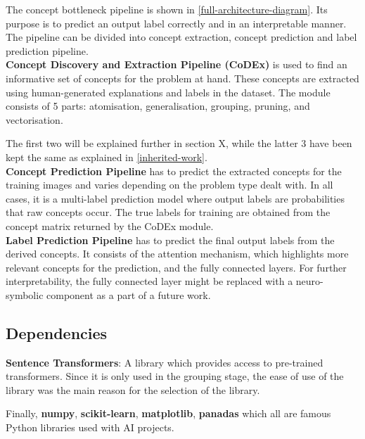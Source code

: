 The concept bottleneck pipeline is shown in \ref{full-architecture-diagram}. 
Its purpose is to predict an output label correctly and in an interpretable manner.
The pipeline can be divided into concept extraction, concept prediction and label prediction pipeline. \\

\textbf{Concept Discovery and Extraction Pipeline (CoDEx)} is used to find an informative set of concepts for the problem at hand.
These concepts are extracted using human-generated explanations and labels in the dataset. 
The module consists of 5 parts: atomisation, generalisation, grouping, pruning, and vectorisation.

The first two will be explained further in section X, while the latter 3 have been kept the same as explained in \autoref{inherited-work}. \\


\textbf{Concept Prediction Pipeline} has to predict the extracted concepts for the training images and varies depending on the problem type dealt with.
In all cases, it is a multi-label prediction model where output labels are probabilities that raw concepts occur.
The true labels for training are obtained from the concept matrix returned by the CoDEx module. \\

\textbf{Label Prediction Pipeline} has to predict the final output labels from the derived concepts. 
It consists of the attention mechanism, which highlights more relevant concepts for the prediction, and the fully connected layers. 
For further interpretability, the fully connected layer might be replaced with a neuro-symbolic component as a part of a future work.

\subsection{Dependencies}

\textbf{Sentence Transformers}: A library which provides access to pre-trained transformers. 
Since it is only used in the grouping stage, the ease of use of the library was the main reason for the selection of the library.


Finally, \textbf{numpy}, \textbf{scikit-learn}, \textbf{matplotlib}, \textbf{panadas} which all are famous Python libraries used with AI projects. \\
